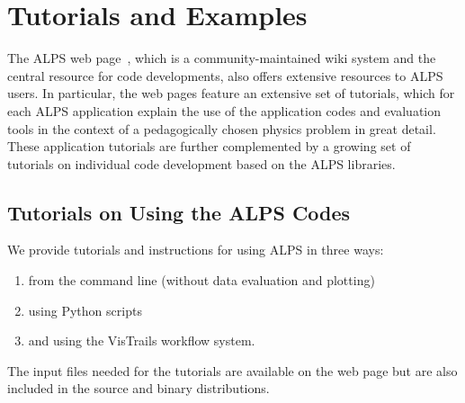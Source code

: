\documentclass[12pt]{iopart}
\begin{document}
\section{Tutorials and Examples}

The ALPS web page~\cite{alps}, which is a community-maintained wiki system and the central resource for code developments,  
also offers extensive resources to ALPS users. In particular, the web pages feature an extensive set of tutorials, which for each ALPS application 
explain the use of the application codes and evaluation tools in the context of a pedagogically chosen physics problem in great detail.
These application tutorials are further complemented by a growing set of tutorials on individual code development based on the ALPS libraries.

\subsection{Tutorials on Using the ALPS Codes}
We provide tutorials and instructions for using ALPS in three ways: 
\begin{enumerate}
\item from the command line (without data evaluation and plotting)
\item using Python scripts
\item and using the VisTrails workflow system. 
\end{enumerate}

The input files needed for the tutorials are available on the web page but are also included in the source and binary distributions.
\end{document}
